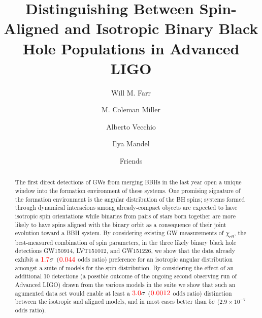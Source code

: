 \documentclass[modern]{aastex61}
\newcommand{\chieff}{\chi_\mathrm{eff}}
\newcommand{\checkme}[1]{\textcolor{red}{#1}}
\newcommand{\OOneSigmaIsoAligned}{\checkme{1.7}}
\newcommand{\OOneOddsIsoAligned}{\checkme{0.044}}
\newcommand{\OTwoSigmaIsoAlignedMin}{\checkme{3.0}}
\newcommand{\OTwoOddsIsoAlignedMin}{\checkme{0.0012}}
\begin{document}

\title{Distinguishing Between Spin-Aligned and Isotropic Binary Black
  Hole Populations in Advanced LIGO}

\author[0000-0003-1540-8562]{Will M. Farr}


\author{M. Coleman Miller}


\author[0000-0002-6254-1617]{Alberto Vecchio}


\author[0000-0002-6134-8946]{Ilya Mandel}


\author{Friends}


\begin{abstract}
  The first direct detections of \acp{GW} from merging \acp{BBH} in
  the last year open a unique window into the formation environment of
  these systems.  One promising signature of the formation environment
  is the angular distribution of the \ac{BH} spins; systems formed
  through dynamical interacions among already-compact objects are
  expected to have isotropic spin orientations while binaries from
  pairs of stars born together are more likely to have spins aligned
  with the binary orbit as a consequence of their joint evolution
  toward a \ac{BBH} system.  By considering existing \ac{GW}
  measurements of $\chieff$, the best-measured combination of spin
  parameters, in the three likely binary black hole detections
  GW150914, LVT151012, and GW151226, we show that the data already
  exhibit a $\OOneSigmaIsoAligned\sigma$ ($\OOneOddsIsoAligned$ odds
  ratio) preference for an isotropic angular distribution amongst a
  suite of models for the spin distribution.  By considering the
  effect of an additional 10 detections (a possible outcome of the
  ongoing second observing run of Advanced LIGO) drawn from the
  various models in the suite we show that such an agumented data set
  would enable at least a $\OTwoSigmaIsoAlignedMin\sigma$
  ($\OTwoOddsIsoAlignedMin$ odds ratio) distinction between the
  isotropic and aligned models, and in most cases better than
  $5\sigma$ ($2.9 \times 10^{-7}$ odds ratio).
\end{abstract}
\end{document}
